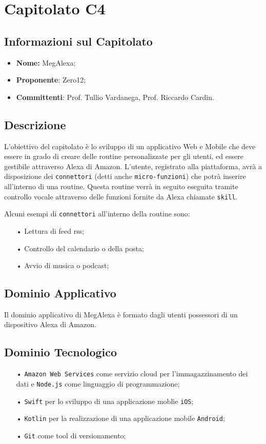 \section{Capitolato C4}
\subsection{Informazioni sul Capitolato}
\begin{itemize}
	\item \textbf{Nome:} MegAlexa;
	\item \textbf{Proponente}: Zero12;
	\item \textbf{Committenti}: Prof. Tullio Vardanega, Prof. Riccardo Cardin.
\end{itemize}

\subsection{Descrizione}
L'obiettivo del capitolato è lo sviluppo di un applicativo Web e Mobile che deve essere in grado di creare delle routine personalizzate per gli utenti, ed essere gestibile attraverso Alexa di Amazon.
L'utente, registrato alla piattaforma, avrà a disposizione dei \texttt{connettori} (detti anche \texttt{micro-funzioni}) che potrà inserire all'interno di una routine. Questa routine verrà in seguito eseguita tramite controllo vocale attraverso delle funzioni fornite da Alexa chiamate \texttt{skill}.

Alcuni esempi di \texttt{connettori} all'interno della routine sono:
\begin{itemize}
\item[•] Lettura di feed rss;
\item[•] Controllo del calendario o della posta;
\item[•] Avvio di musica o podcast;
\end{itemize}


\subsection{Dominio Applicativo}
Il dominio applicativo di MegAlexa è formato dagli utenti possessori di un dispositivo Alexa di Amazon.

\subsection{Dominio Tecnologico}
\begin{itemize}
\item[•] \texttt{Amazon Web Services} come servizio cloud per l'immagazzinamento dei dati e \texttt{Node.js} come linguaggio di programmazione;
\item[•] \texttt{Swift} per lo sviluppo di una applicazione moblie \texttt{iOS};
\item[•] \texttt{Kotlin} per la realizzazione di una applicazione mobile \texttt{Android};
\item[•] \texttt{Git} come tool di versionamento;
\end{itemize}

